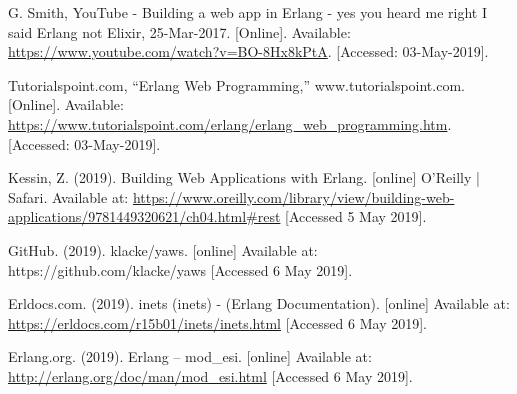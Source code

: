 \documentclass[11 pt]{IEEEtran}
\begin{document}
\begin{thebibliography}{99}
G. Smith, YouTube - Building a web app in Erlang - yes you heard me right I said Erlang not Elixir, 25-Mar-2017. [Online]. Available: \url{https://www.youtube.com/watch?v=BO-8Hx8kPtA}. [Accessed: 03-May-2019].

Tutorialspoint.com, ``Erlang Web Programming,'' www.tutorialspoint.com. [Online]. Available: \url{https://www.tutorialspoint.com/erlang/erlang_web_programming.htm}. [Accessed: 03-May-2019].

Kessin, Z. (2019). Building Web Applications with Erlang. [online] O'Reilly | Safari. Available at: \url{https://www.oreilly.com/library/view/building-web-applications/9781449320621/ch04.html#rest} [Accessed 5 May 2019].

GitHub. (2019). klacke/yaws. [online] Available at: https://github.com/klacke/yaws [Accessed 6 May 2019].

Erldocs.com. (2019). inets (inets) - (Erlang Documentation). [online] Available at: \url{https://erldocs.com/r15b01/inets/inets.html} [Accessed 6 May 2019].

Erlang.org. (2019). Erlang -- mod\_esi. [online] Available at: \url{http://erlang.org/doc/man/mod_esi.html} [Accessed 6 May 2019].


\end{thebibliography}
\end{document}
